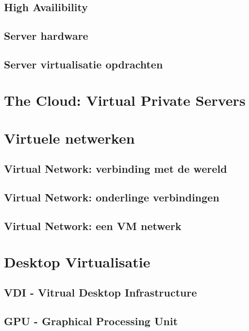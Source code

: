 \documentclass[a4paper,12pt,twoside,openright,titlepage]{book}
\begin{document}
\subsection{High Availibility}

\subsection{Server hardware}

\subsection{Server virtualisatie opdrachten}

\section{The Cloud: Virtual Private Servers}

\section{Virtuele netwerken}

\subsection{Virtual Network: verbinding met de wereld}

\subsection{Virtual Network: onderlinge verbindingen}

\subsection{Virtual Network: een VM netwerk}

\section{Desktop Virtualisatie}

\subsection{VDI - Vitrual Desktop Infrastructure}

\subsection{GPU - Graphical Processing Unit}

\end{document}
